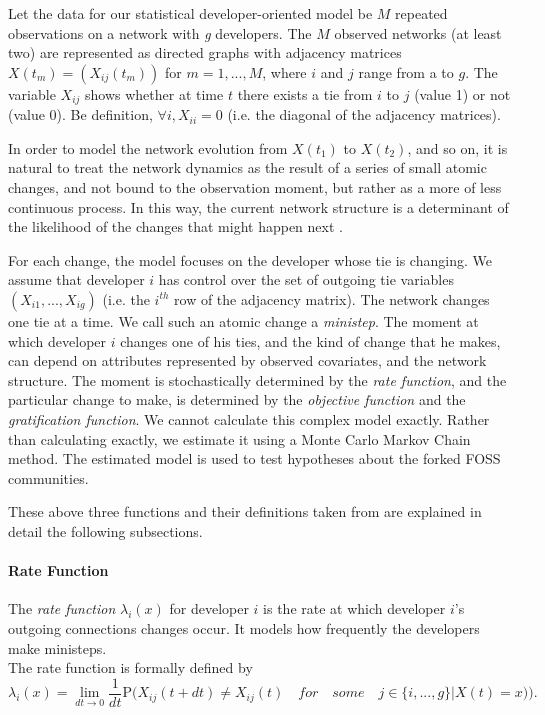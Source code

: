 \documentclass[12pt]{report}
\begin{document}
Let the data for our statistical developer-oriented model be $M$ repeated observations on a network with \textit{g} developers. The $M$ observed networks (at least two) are represented as directed graphs with adjacency matrices $X(t_m) = (X_{ij}(t_m))$ for $m = 1,...,M$, where $i$ and $j$ range from a to $g$. The variable $X_{ij}$ shows whether at time $t$ there exists a tie from $i$ to $j$ (value 1) or not (value 0). Be definition, $\forall i, X_{ii}=0$ (i.e. the diagonal of the adjacency matrices).

In order to model the network evolution from $X(t_1)$ to $X(t_2)$, and so on, it is natural to treat the network dynamics as the result of a series of small atomic changes, and not bound to the observation moment, but rather as a more of less continuous process. In this way, the current network structure is a determinant of the likelihood of the changes that might happen next \cite{Coleman1964}. 

For each change, the model focuses on the developer whose tie is changing. We assume that developer $i$ has control over the set of outgoing  tie variables $(X_{i1}, ..., X_{ig})$ (i.e. the $i^{th}$ row of the adjacency matrix). The network changes one tie at a time. We call such an atomic change a \textit{ministep}. The moment at which developer $i$ changes one of his ties, and the kind of change that he makes, can depend on attributes represented by observed covariates, and the network structure. The moment is stochastically determined by the \textit{rate function}, and the particular change to make, is determined by the \textit{objective function} and the \textit{gratification function}. We cannot calculate this complex model exactly. Rather than calculating exactly, we estimate it using a Monte Carlo Markov Chain method. The estimated model is used to test hypotheses about the forked FOSS communities. 

These above three functions and their definitions taken from \cite{Snijders2004} are explained in detail the following subsections.

\paragraph*{Rate Function}

The \textit{rate function} $\lambda_i(x)$ for developer $i$ is the rate at which developer $i$'s outgoing connections changes occur. It models how frequently the developers make ministeps.\\
The rate function is formally defined \cite{Snijders2004} by
\begin{equation}
\lambda_i(x) = \lim_{dt \to 0} \frac{1}{dt} \mathrm {P} \big({X_{ij}(t + dt) \neq X_{ij}(t) \quad for \quad some \quad j \in \{i, ..., g\} | X(t) = x)}\big).
\end{equation}
\end{document}

